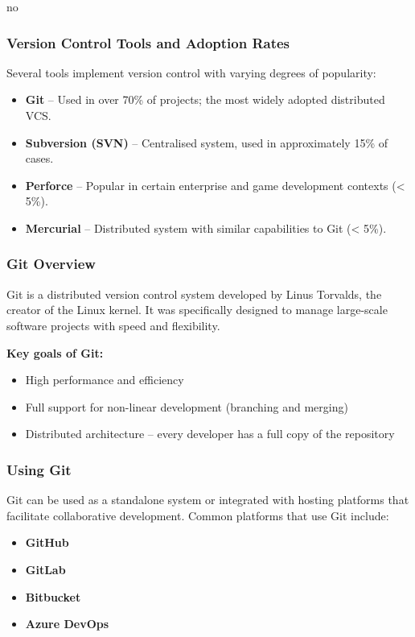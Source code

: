 no\documentclass{article}
\begin{document}
\subsubsection{Version Control Tools and Adoption Rates}

Several tools implement version control with varying degrees of popularity:

\begin{itemize}
    \item \textbf{Git} – Used in over 70\% of projects; the most widely adopted distributed VCS.
    \item \textbf{Subversion (SVN)} – Centralised system, used in approximately 15\% of cases.
    \item \textbf{Perforce} – Popular in certain enterprise and game development contexts (< 5\%).
    \item \textbf{Mercurial} – Distributed system with similar capabilities to Git (< 5\%).
\end{itemize}

\subsubsection{Git Overview}

Git is a distributed version control system developed by Linus Torvalds, the creator of the Linux kernel. It was specifically designed to manage large-scale software projects with speed and flexibility.

\vspace{1em}
\noindent\textbf{Key goals of Git:}
\begin{itemize}
    \item High performance and efficiency
    \item Full support for non-linear development (branching and merging)
    \item Distributed architecture – every developer has a full copy of the repository
\end{itemize}

\subsubsection{Using Git}

Git can be used as a standalone system or integrated with hosting platforms that facilitate collaborative development. Common platforms that use Git include:

\begin{itemize}
    \item \textbf{GitHub}
    \item \textbf{GitLab}
    \item \textbf{Bitbucket}
    \item \textbf{Azure DevOps}
\end{itemize}
\end{document}
